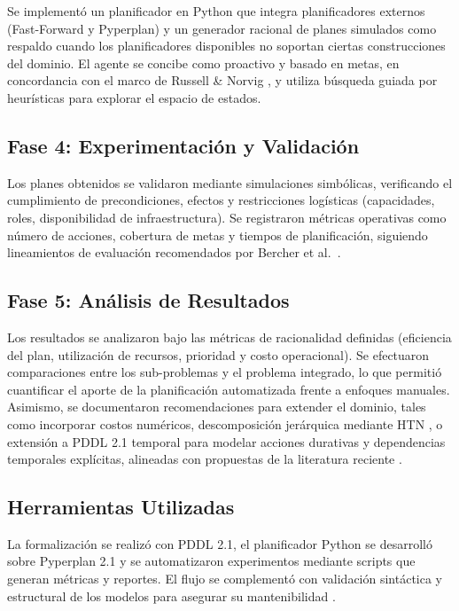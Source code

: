 \documentclass[conference]{IEEEtran}
\begin{document}
    Se implementó un planificador en Python que integra planificadores externos (Fast-Forward y Pyperplan) y un generador racional de planes simulados como respaldo cuando los planificadores disponibles no soportan ciertas construcciones del dominio. El agente se concibe como proactivo y basado en metas, en concordancia con el marco de Russell \& Norvig \cite{russell2020aima}, y utiliza búsqueda guiada por heurísticas para explorar el espacio de estados.

    \subsection{Fase 4: Experimentación y Validación}

    Los planes obtenidos se validaron mediante simulaciones simbólicas, verificando el cumplimiento de precondiciones, efectos y restricciones logísticas (capacidades, roles, disponibilidad de infraestructura). Se registraron métricas operativas como número de acciones, cobertura de metas y tiempos de planificación, siguiendo lineamientos de evaluación recomendados por Bercher et al.\ \cite{bercher2025}.

    \subsection{Fase 5: Análisis de Resultados}

    Los resultados se analizaron bajo las métricas de racionalidad definidas (eficiencia del plan, utilización de recursos, prioridad y costo operacional). Se efectuaron comparaciones entre los sub-problemas y el problema integrado, lo que permitió cuantificar el aporte de la planificación automatizada frente a enfoques manuales. Asimismo, se documentaron recomendaciones para extender el dominio, tales como incorporar costos numéricos, descomposición jerárquica mediante HTN \cite{liu2016htn}, o extensión a PDDL 2.1 temporal \cite{fox2003pddl} para modelar acciones durativas y dependencias temporales explícitas, alineadas con propuestas de la literatura reciente \cite{yang2022,bezrucav2022}.

    \subsection{Herramientas Utilizadas}

    La formalización se realizó con PDDL 2.1, el planificador Python se desarrolló sobre Pyperplan 2.1 y se automatizaron experimentos mediante scripts que generan métricas y reportes. El flujo se complementó con validación sintáctica y estructural de los modelos para asegurar su mantenibilidad \cite{heuss2024}.
\end{document}
